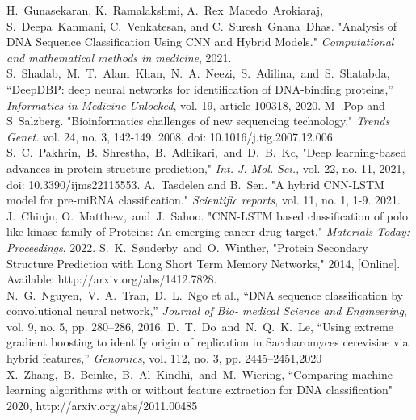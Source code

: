 \documentclass[journal]{IEEEtran}
\begin{document}
\begin{thebibliography}{1}

  H.~Gunasekaran, K.~Ramalakshmi, A.~Rex~Macedo~Arokiaraj, S.~Deepa~Kanmani, C.~Venkatesan, and C.~Suresh~Gnana~Dhas.
  "Analysis of DNA Sequence Classification Using CNN and Hybrid Models."
  \emph{Computational and mathematical methods in medicine}, 2021.
  S.~Shadab,~M.~T.~Alam~Khan,~N.~A.~Neezi,~S.~Adilina,~and~S.~Shatabda,
  “DeepDBP: deep neural networks for identification of DNA-binding proteins,”
  \emph{Informatics in Medicine Unlocked}, vol. 19, article 100318, 2020.
  M~.Pop and S~Salzberg. "Bioinformatics challenges of new sequencing technology."
  \emph{Trends Genet}. vol. 24, no. 3, 142-149. 2008, doi: 10.1016/j.tig.2007.12.006.
  S.~C.~Pakhrin,~B.~Shrestha,~B.~Adhikari,~and~D.~B.~Kc,
  "Deep learning-based advances in protein structure prediction,"
  \emph{Int. J. Mol. Sci.}, vol. 22, no. 11, 2021, doi: 10.3390/ijms22115553.
  A.~Tasdelen and B.~Sen. "A hybrid CNN-LSTM model for pre-miRNA classification."
  \emph{Scientific reports}, vol. 11, no. 1, 1-9. 2021.
  J.~Chinju, O.~Matthew,~and~J.~Sahoo. "CNN-LSTM based classification of polo like kinase family of Proteins: An emerging cancer drug target."
  \emph{Materials Today: Proceedings}, 2022.
  S.~K.~Sønderby~and~O.~Winther, "Protein Secondary Structure Prediction with Long Short Term Memory Networks," 2014,
  [Online]. Available: http://arxiv.org/abs/1412.7828.
  N.~G.~Nguyen,~V.~A.~Tran,~D.~L.~Ngo et al., “DNA sequence classification by convolutional neural network,” \emph{Journal of Bio-
  medical Science and Engineering}, vol. 9, no. 5, pp. 280–286, 2016.
  D.~T.~Do~and~N.~Q.~K.~Le, “Using extreme gradient boosting to identify origin of replication in Saccharomyces cerevisiae via
  hybrid features,” \emph{Genomics}, vol. 112, no. 3, pp. 2445–2451,2020
  X.~Zhang,~B.~Beinke,~B.~Al~Kindhi,~and~M.~Wiering, “Comparing machine learning algorithms with or without feature extraction for DNA classification"
  2020, http://arxiv.org/abs/2011.00485

\end{thebibliography}
\end{document}
